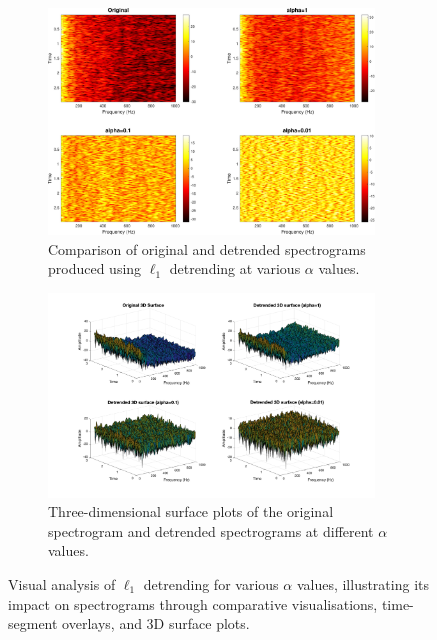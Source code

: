 \begin{figure}
    \ContinuedFloat
    \begin{subfigure}[t]{\textwidth}
        \centering
        \includegraphics[width=0.95\textwidth]{img/ch4/l1/example_l1_plots/spec_comparison.pdf}
        \caption{Comparison of original and detrended spectrograms produced using $\ell_1$ detrending at various $\alpha$ values.}
        \label{fig:l1:spectrogram-comparison}
    \end{subfigure}
    
    \vspace{1cm}
    
    \begin{subfigure}[t]{\textwidth}
        \centering
        \includegraphics[trim={3cm 1.5cm 2.5cm 1cm},clip,width=0.95\textwidth]{img/ch4/l1/example_l1_plots/3d_plot.pdf} %
        \caption{Three-dimensional surface plots of the original spectrogram and detrended spectrograms at different $\alpha$ values.}
        \label{fig:l1:3d}
    \end{subfigure}
    \caption{Visual analysis of $\ell_1$ detrending for various $\alpha$ values, illustrating its impact on spectrograms through comparative visualisations, time-segment overlays, and 3D surface plots.}
    \label{fig:l1:overview}
\end{figure}

